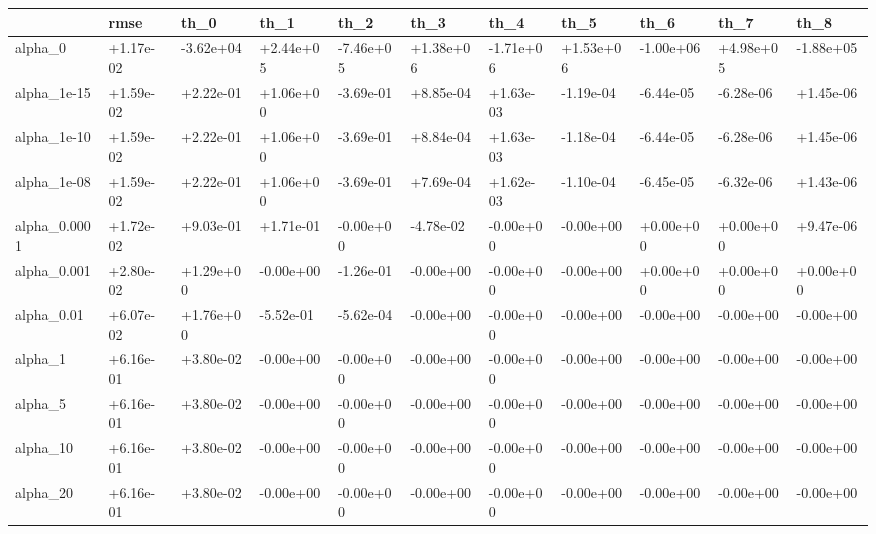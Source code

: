 \begin{tabular}{lllllllllll}
\toprule
{} &      rmse &      th\_0 &      th\_1 &      th\_2 &      th\_3 &      th\_4 &      th\_5 &      th\_6 &      th\_7 &      th\_8 \\
\midrule
alpha\_0      & +1.17e-02 & -3.62e+04 & +2.44e+05 & -7.46e+05 & +1.38e+06 & -1.71e+06 & +1.53e+06 & -1.00e+06 & +4.98e+05 & -1.88e+05 \\
alpha\_1e-15  & +1.59e-02 & +2.22e-01 & +1.06e+00 & -3.69e-01 & +8.85e-04 & +1.63e-03 & -1.19e-04 & -6.44e-05 & -6.28e-06 & +1.45e-06 \\
alpha\_1e-10  & +1.59e-02 & +2.22e-01 & +1.06e+00 & -3.69e-01 & +8.84e-04 & +1.63e-03 & -1.18e-04 & -6.44e-05 & -6.28e-06 & +1.45e-06 \\
alpha\_1e-08  & +1.59e-02 & +2.22e-01 & +1.06e+00 & -3.69e-01 & +7.69e-04 & +1.62e-03 & -1.10e-04 & -6.45e-05 & -6.32e-06 & +1.43e-06 \\
alpha\_0.0001 & +1.72e-02 & +9.03e-01 & +1.71e-01 & -0.00e+00 & -4.78e-02 & -0.00e+00 & -0.00e+00 & +0.00e+00 & +0.00e+00 & +9.47e-06 \\
alpha\_0.001  & +2.80e-02 & +1.29e+00 & -0.00e+00 & -1.26e-01 & -0.00e+00 & -0.00e+00 & -0.00e+00 & +0.00e+00 & +0.00e+00 & +0.00e+00 \\
alpha\_0.01   & +6.07e-02 & +1.76e+00 & -5.52e-01 & -5.62e-04 & -0.00e+00 & -0.00e+00 & -0.00e+00 & -0.00e+00 & -0.00e+00 & -0.00e+00 \\
alpha\_1      & +6.16e-01 & +3.80e-02 & -0.00e+00 & -0.00e+00 & -0.00e+00 & -0.00e+00 & -0.00e+00 & -0.00e+00 & -0.00e+00 & -0.00e+00 \\
alpha\_5      & +6.16e-01 & +3.80e-02 & -0.00e+00 & -0.00e+00 & -0.00e+00 & -0.00e+00 & -0.00e+00 & -0.00e+00 & -0.00e+00 & -0.00e+00 \\
alpha\_10     & +6.16e-01 & +3.80e-02 & -0.00e+00 & -0.00e+00 & -0.00e+00 & -0.00e+00 & -0.00e+00 & -0.00e+00 & -0.00e+00 & -0.00e+00 \\
alpha\_20     & +6.16e-01 & +3.80e-02 & -0.00e+00 & -0.00e+00 & -0.00e+00 & -0.00e+00 & -0.00e+00 & -0.00e+00 & -0.00e+00 & -0.00e+00 \\
\bottomrule
\end{tabular}
